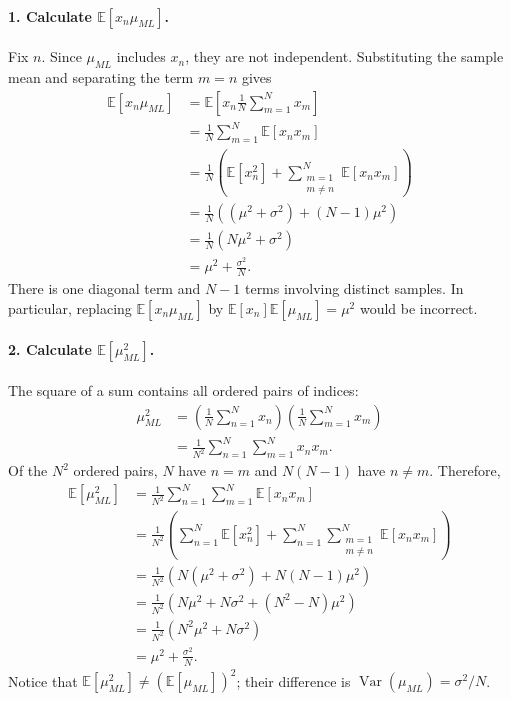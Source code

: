 \documentclass{article}
\begin{document}
\begin{tcolorbox}[breakable,colback=gray!5,colframe=gray!60,title=Solution]
\paragraph{1. Calculate $\mathbb{E}[x_n\mu_{ML}]$.}
Fix $n$. Since $\mu_{ML}$ includes $x_n$, they are not independent.
Substituting the sample mean and separating the term $m=n$ gives
\begin{align*}
\mathbb{E}[x_n\mu_{ML}]
&=\mathbb{E}\left[x_n\frac{1}{N}\sum_{m=1}^{N}x_m\right] \\
&=\frac{1}{N}\sum_{m=1}^{N}\mathbb{E}[x_nx_m] \\
&=\frac{1}{N}\left(\mathbb{E}[x_n^2]
+\sum_{\substack{m=1\\m\neq n}}^{N}\mathbb{E}[x_nx_m]\right) \\
&=\frac{1}{N}\left((\mu^2+\sigma^2)+(N-1)\mu^2\right) \\
&=\frac{1}{N}\left(N\mu^2+\sigma^2\right) \\
&=\mu^2+\frac{\sigma^2}{N}.
\end{align*}
There is one diagonal term and $N-1$ terms involving distinct samples.
In particular, replacing $\mathbb{E}[x_n\mu_{ML}]$ by
$\mathbb{E}[x_n]\mathbb{E}[\mu_{ML}]=\mu^2$ would be incorrect.

\paragraph{2. Calculate $\mathbb{E}[\mu_{ML}^2]$.}
The square of a sum contains all ordered pairs of indices:
\begin{align*}
\mu_{ML}^2
&=\left(\frac{1}{N}\sum_{n=1}^{N}x_n\right)
  \left(\frac{1}{N}\sum_{m=1}^{N}x_m\right) \\
&=\frac{1}{N^2}\sum_{n=1}^{N}\sum_{m=1}^{N}x_nx_m.
\end{align*}
Of the $N^2$ ordered pairs, $N$ have $n=m$ and $N(N-1)$ have $n\neq m$.
Therefore,
\begin{align*}
\mathbb{E}[\mu_{ML}^2]
&=\frac{1}{N^2}\sum_{n=1}^{N}\sum_{m=1}^{N}\mathbb{E}[x_nx_m] \\
&=\frac{1}{N^2}\left(
  \sum_{n=1}^{N}\mathbb{E}[x_n^2]
  +\sum_{n=1}^{N}\sum_{\substack{m=1\\m\neq n}}^{N}\mathbb{E}[x_nx_m]
  \right) \\
&=\frac{1}{N^2}\left(N(\mu^2+\sigma^2)+N(N-1)\mu^2\right) \\
&=\frac{1}{N^2}\left(N\mu^2+N\sigma^2+(N^2-N)\mu^2\right) \\
&=\frac{1}{N^2}\left(N^2\mu^2+N\sigma^2\right) \\
&=\mu^2+\frac{\sigma^2}{N}.
\end{align*}
Notice that $\mathbb{E}[\mu_{ML}^2]\neq(\mathbb{E}[\mu_{ML}])^2$;
their difference is $\operatorname{Var}(\mu_{ML})=\sigma^2/N$.


\end{tcolorbox}
\end{document}
